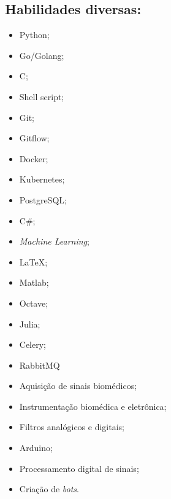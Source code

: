 \documentclass[11pt]{article}
\begin{document}
\subsection{Habilidades diversas:}
\begin{multicols}{3} %
\begin{itemize}
    \item Python;
    \item Go/Golang;
    \item C;
    \item Shell script;
    \item Git;
    \item Gitflow;
    \item Docker;
    \item Kubernetes;
    \item PostgreSQL;
    \item C\#;
    \item \textit{Machine Learning};
    \item \LaTeX ;
    \item Matlab;
    \item Octave;
    \item Julia;
    \item Celery;
    \item RabbitMQ
    \item Aquisição de sinais biomédicos;
    \item Instrumentação biomédica e eletrônica;
    \item Filtros analógicos e digitais;
    \item Arduino;
    \item Processamento digital de sinais;
    \item Criação de \textit{bots}.
\end{itemize}
\end{multicols}
\end{document}
